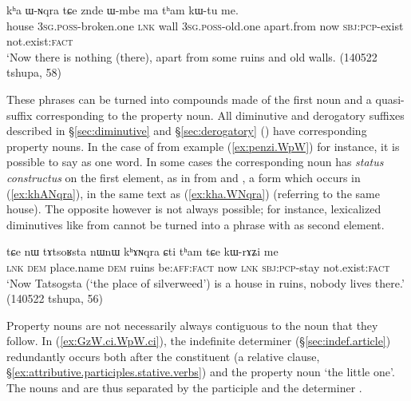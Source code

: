 \begin{exe}
\ex \label{ex:kha.WNqra}
 \gll kʰa ɯ-ɴqra tɕe znde ɯ-mbe ma tʰam kɯ-tu me. \\
house \textsc{3sg}.\textsc{poss}-broken.one \textsc{lnk} wall \textsc{3sg}.\textsc{poss}-old.one apart.from now \textsc{sbj}:\textsc{pcp}-exist not.exist:\textsc{fact} \\ 
\glt `Now there is nothing (there), apart from some ruins and old walls. (140522 tshupa, 58)
\end{exe}

These phrases can be turned into compounds made of the first noun and a quasi-suffix corresponding to the property noun. All diminutive and derogatory suffixes described in §\ref{sec:diminutive} and §\ref{sec:derogatory} () have corresponding property nouns. In the case of   from example (\ref{ex:penzi.WpW}) for instance, it is possible to say  as one word. In some cases the corresponding noun has \textit{status constructus} on the first element, as in  from  and , a form which occurs in (\ref{ex:khANqra}), in the same text as  (\ref{ex:kha.WNqra}) (referring to the same house). The opposite however is not always possible; for instance, lexicalized diminutives like  from  cannot be turned into a phrase with  as second element.

\begin{exe}
\ex \label{ex:khANqra}
 \gll tɕe nɯ tɤtsoʁsta nɯnɯ kʰɤɴqra ɕti tʰam tɕe kɯ-rɤʑi me \\
\textsc{lnk} \textsc{dem} place.name \textsc{dem} ruins be:\textsc{aff}:\textsc{fact}  now \textsc{lnk} \textsc{sbj}:\textsc{pcp}-stay not.exist:\textsc{fact} \\
\glt `Now Tatsogsta (`the place of silverweed') is a house in ruins, nobody lives there.' (140522 tshupa, 56)
\end{exe}

Property nouns are not necessarily always contiguous to the noun that they follow. In (\ref{ex:GzW.ci.WpW.ci}), the indefinite determiner  (§\ref{sec:indef.article}) redundantly occurs both after the constituent  (a relative clause, §\ref{ex:attributive.participles.stative.verbs}) and the property noun  `the little one'. The nouns  and  are thus separated by the participle  and the determiner .

